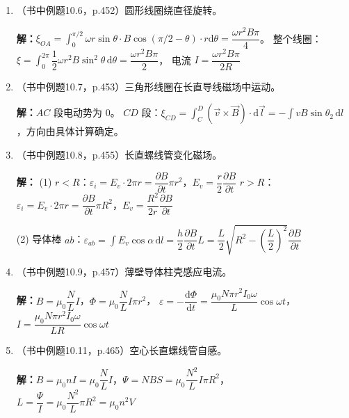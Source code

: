 \documentclass{ctexart}
\begin{document}
\begin{enumerate}
\textbf{解：}盘心到边缘：$\varepsilon = \displaystyle\int_0^R B\omega r\,\mathrm{d}r = \dfrac12 B\omega R^{2}$，
$\Delta U = -\dfrac12 B\omega R^{2}$。
代入 $B = 0.70\,\text{T}$，$R = 0.20\,\text{m}$，$\omega = 2\pi\times50\,\text{s}^{-1}$：
$|\Delta U| = \dfrac12 \times 0.70 \times 2\pi \times 50 \times (0.20)^{2} = 4.4\,\text{V}$

\item（书中例题10.6，p.452）圆形线圈绕直径旋转。

\textbf{解：}$\xi_{OA} = \displaystyle\int_0^{\pi/2} \omega r\sin\theta\cdot B\cos(\pi/2 - \theta)\cdot r\mathrm{d}\theta = \dfrac{\omega r^{2}B\pi}{4}$。
整个线圈：$\xi = \displaystyle\int_0^{2\pi} \dfrac12 \omega r^{2}B\sin^{2}\theta\,\mathrm{d}\theta = \dfrac{\omega r^{2}B\pi}{2}$，
电流 $I = \dfrac{\omega r^{2}B\pi}{2R}$

\item（书中例题10.7，p.453）三角形线圈在长直导线磁场中运动。

\textbf{解：}$AC$ 段电动势为 $0$。
$CD$ 段：$\xi_{CD} = \displaystyle\int_C^D (\vec{v}\times\vec{B})\cdot\mathrm{d}\vec{l} = -\displaystyle\int vB\sin\theta_2\,\mathrm{d}l$，方向由具体计算确定。

\item（书中例题10.8，p.455）长直螺线管变化磁场。

\textbf{解：}
(1) $r < R$：$\varepsilon_i = E_v\cdot 2\pi r = \dfrac{\partial B}{\partial t}\pi r^{2}$，$E_v = \dfrac{r}{2}\dfrac{\partial B}{\partial t}$
$r > R$：$\varepsilon_i = E_v\cdot 2\pi r = \dfrac{\partial B}{\partial t}\pi R^{2}$，$E_v = \dfrac{R^{2}}{2r}\dfrac{\partial B}{\partial t}$

(2) 导体棒 $ab$：$\varepsilon_{ab} = \displaystyle\int E_v\cos\alpha\,\mathrm{d}l = \dfrac{h}{2}\dfrac{\partial B}{\partial t}L = \dfrac{L}{2}\sqrt{R^{2} - \left(\dfrac{L}{2}\right)^{2}}\dfrac{\partial B}{\partial t}$

\item（书中例题10.9，p.457）薄壁导体柱壳感应电流。

\textbf{解：}$B = \mu_0\dfrac{N}{L}I$，$\Phi = \mu_0\dfrac{N}{L}I\pi r^{2}$，
$\varepsilon = -\dfrac{\mathrm{d}\Phi}{\mathrm{d}t} = \dfrac{\mu_0 N\pi r^{2}I_0\omega}{L}\cos\omega t$，
$I = \dfrac{\mu_0 N\pi r^{2}I_0\omega}{LR}\cos\omega t$

\item（书中例题10.11，p.465）空心长直螺线管自感。

\textbf{解：}$B = \mu_0 nI = \mu_0\dfrac{N}{L}I$，$\Psi = NBS = \mu_0\dfrac{N^{2}}{L}I\pi R^{2}$，
$L = \dfrac{\Psi}{I} = \mu_0\dfrac{N^{2}}{L}\pi R^{2} = \mu_0 n^{2}V$


\end{enumerate}
\end{document}
